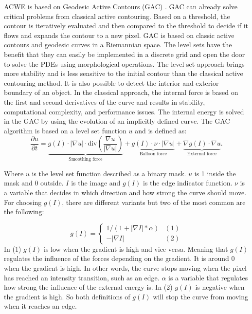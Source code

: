 ACWE is based on Geodesic Active Contours (GAC) \cite{vondracek_image_2018}. GAC can already solve critical problems from classical active contouring. Based on a threshold, the contour is iteratively evaluated and then compared to the threshold to decide if it flows and expands the contour to a new pixel. GAC is based on classic active contours and geodesic curves in a Riemannian space. The level sets have the benefit that they can easily be implemented in a discrete grid and open the door to solve the PDEs using morphological operations. The level set approach brings more stability and is less sensitive to the initial contour than the classical active contouring method. It is also possible to detect the interior and exterior boundary of an object. In the classical approach, the internal force is based on the first and second derivatives of the curve and results in stability, computational complexity, and performance issues. The internal energy is solved in the GAC by using the evolution of an implicitly defined curve. The GAC algorithm is based on a level set function $u$ and is defined as:
\begin{equation}
    \frac{\partial u}{\partial t} = 
    \underbrace{g(I) \cdot |\nabla u| \cdot \text{div} \left(\frac{\nabla u}{|\nabla u|}\right)}_{\text{Smoothing force}} 
    + \underbrace{g(I) \cdot \nu \cdot |\nabla u|}_{\text{Balloon force}} 
    + \underbrace{\nabla g(I) \cdot \nabla u}_{\text{External force}}.
    \label{deform}
    \end{equation}
    
Where $u$ is the level set function described as a binary mask. $u$ is 1 inside the mask and 0 outside. $I$ is the image and $g(I)$ is the edge indicator function. $\nu$ is a variable that decides in which direction and how strong the curve should move. 
For choosing $g(I)$, there are different variants but two of the most common are the following: 

\begin{equation}
    g(I) = \begin{cases}
     1/(1 + |\nabla I|*\alpha) &(1)\\
     -|\nabla I| &(2)
    \end{cases}
\end{equation}
In (1) $g(I)$ is low when the gradient is high and vice versa. Meaning that $g(I)$ regulates the influence of the forces depending on the gradient. It is around 0 when the gradient is high. In other words, the curve stops moving when the pixel has reached an intensity transition, such as an edge. $\alpha$ is a variable that regulates how strong the influence of the external energy is. In (2) $g(I)$ is negative when the gradient is high. So both definitions of $g(I)$ will stop the curve from moving when it reaches an edge.

